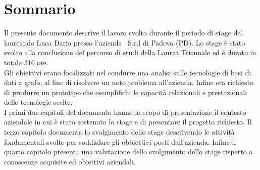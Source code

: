 
\cleardoublepage
{}
{}
\begingroup
\let\clearpage\relax
\let\cleardoublepage\relax
\let\cleardoublepage\relax

\chapter*{Sommario}

Il presente documento descrive il lavoro svolto durante il periodo di stage dal laureando Luca Dario presso l'azienda \azienda\ S.r.l di Padova (PD). Lo stage è stato svolto alla conclusione del percorso di studi della Laurea Triennale ed è durato in totale 316 ore.\\
Gli obiettivi erano focalizzati nel condurre una analisi sulle tecnologie di basi di dati a grafo, al fine di risolvere un noto problema all'azienda. Infine era richiesto di produrre un prototipo che esemplifichi le capacità relazionali e prestazionali delle tecnologie scelte.\\
I primi due capitoli del documento hanno lo scopo di presentazione il contesto aziendale in cui è stato sostenuto lo stage e di presentare il progetto richiesto. Il terzo capitolo documenta lo svolgimento dello stage descrivendo le attività fondamentali svolte per soddisfare gli obbiettivi posti dall'azienda. Infine il quarto capitolo presenta una valutazione dello svolgimento dello stage rispetto a conoscenze acquisite ed obiettivi aziendali.
%
%

\endgroup			

\vfill

